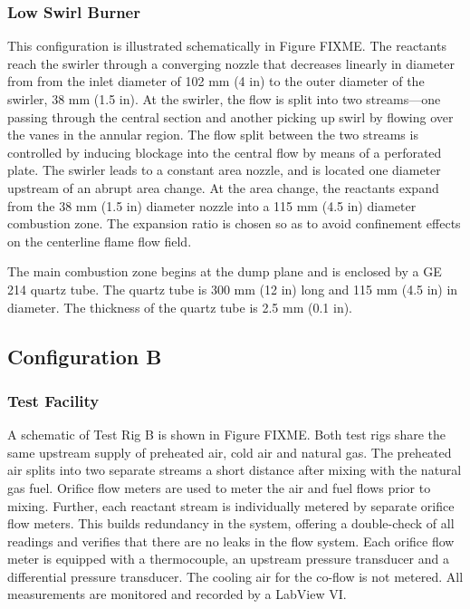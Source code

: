 \subsubsection{Low Swirl Burner}

This configuration is illustrated schematically in Figure FIXME.
The reactants reach the swirler through a converging nozzle that decreases linearly in diameter from from the inlet diameter of 102 mm (4 in) to the outer diameter of the swirler, 38 mm (1.5 in).
At the swirler, the flow is split into two streams---one passing through the central section and another picking up swirl by flowing over the vanes in the annular region.
The flow split between the two streams is controlled by inducing blockage into the central flow by means of a perforated plate.
The swirler leads to a constant area nozzle, and is located one diameter upstream of an abrupt area change.
At the area change, the reactants expand from the 38 mm (1.5 in) diameter nozzle into a 115 mm (4.5 in) diameter combustion zone.
The expansion ratio is chosen so as to avoid confinement effects on the centerline flame flow field.\cite{1998-yegian}

The main combustion zone begins at the dump plane and is enclosed by a GE 214 quartz tube.
The quartz tube is 300 mm (12 in) long and 115 mm (4.5 in) in diameter.
The thickness of the quartz tube is 2.5 mm (0.1 in).

\subsection{Configuration B}

\subsubsection{Test Facility}

A schematic of Test Rig B is shown in Figure FIXME.
Both test rigs share the same upstream supply of preheated air, cold air and natural gas.
The preheated air splits into two separate streams a short distance after mixing with the natural gas fuel.
Orifice flow meters are used to meter the air and fuel flows prior to mixing.
Further, each reactant stream is individually metered by separate orifice flow meters.
This builds redundancy in the system, offering a double-check of all readings and verifies that there are no leaks in the flow system.
Each orifice flow meter is equipped with a thermocouple, an upstream pressure transducer and a differential pressure transducer.
The cooling air for the co-flow is not metered.
All measurements are monitored and recorded by a LabView VI.

